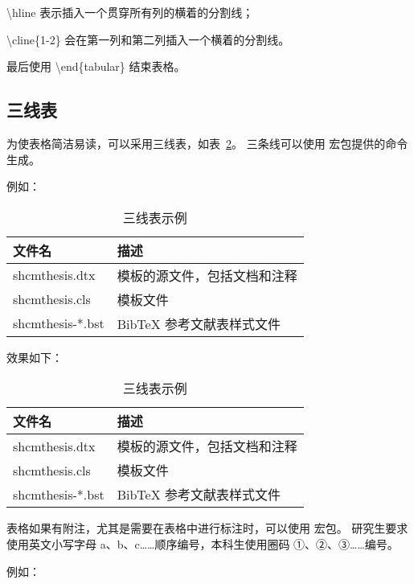 \textbackslash hline 表示插入一个贯穿所有列的横着的分割线；

\textbackslash cline\{1-2\} 会在第一列和第二列插入一个横着的分割线。

最后使用 \textbackslash end\{tabular\} 结束表格。

\subsection{三线表}

为使表格简洁易读，可以采用三线表，如表~\ref{tab:three-line}。
三条线可以使用  宏包提供的命令生成。

例如：

\begin{python}
\begin{table}
	\centering
	\caption{三线表示例}
	\begin{tabular}{ll}
		\toprule
		文件名          & 描述                         \\
		\midrule
		shcmthesis.dtx   & 模板的源文件，包括文档和注释 \\
		shcmthesis.cls   & 模板文件                     \\
		shcmthesis-*.bst & BibTeX 参考文献表样式文件    \\
		\bottomrule
	\end{tabular}
	\label{tab:three-line}
\end{table}
\end{python}

效果如下：

\begin{table}
	\centering
	\caption{三线表示例}
	\begin{tabular}{ll}
		\toprule
		文件名          & 描述                         \\
		\midrule
		shcmthesis.dtx   & 模板的源文件，包括文档和注释 \\
		shcmthesis.cls   & 模板文件                     \\
		shcmthesis-*.bst & BibTeX 参考文献表样式文件    \\
		\bottomrule
	\end{tabular}
	\label{tab:three-line}
\end{table}

表格如果有附注，尤其是需要在表格中进行标注时，可以使用  宏包。
研究生要求使用英文小写字母 a、b、c……顺序编号，本科生使用圈码 ①、②、③……编号。

例如：

